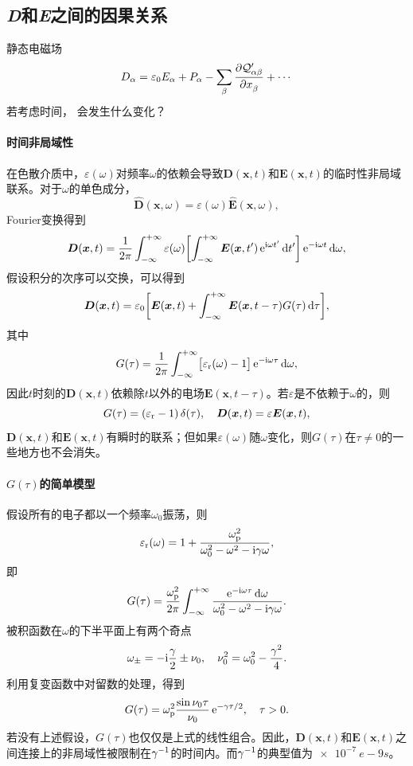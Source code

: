 \subsection{\textit{\textbf{D}}和\textit{\textbf{E}}之间的因果关系}
静态电磁场
\[
    D_\alpha=\varepsilon_0E_\alpha+P_\alpha-\sum_\beta\frac{\partial^{\;\!\!}\mathcal Q'_{\alpha\beta}}{\partial x_\beta^{\;\!\!}}+\cdots
\]
若考虑时间，
会发生什么变化？
\paragraph{时间非局域性}
在色散介质中，$\varepsilon(\omega)$对频率$\omega$的依赖会导致$\bm D(\bm x,t)$和$\bm E(\bm x,t)$的临时性非局域联系。对于$\omega$的单色成分，
\[
    \hat{\bm D}(\bm x,\omega)=\varepsilon(\omega)\hat{\bm E}(\bm x,\omega),
\]
Fourier变换得到
\[
    \bm D(\bm x,t)=\frac1{2\pi}\int_{-\infty}^{+\infty}\varepsilon(\omega)\biggl[\int_{-\infty}^{+\infty}\bm E(\bm x,t')\mathop{}\!\mathrm{e}^{\mathrm{i}\omega t'}\mathop{}\!\mathrm{d} t'\biggr]\mathop{}\!\mathrm{e}^{-\mathrm{i}\omega t}\mathop{}\!\mathrm{d}\omega,
\]
假设积分的次序可以交换，可以得到
\begin{equation}
    \label{eqn:D-E with omega}
    \bm D(\bm x,t)=\varepsilon_0\biggl[\bm E(\bm x,t)+\int_{-\infty}^{+\infty}\bm E(\bm x,t-\tau)G(\tau)\mathop{}\!\mathrm{d}\tau\biggr],
\end{equation}
其中 
\[
    G(\tau)=\frac1{2\pi}\int_{-\infty}^{+\infty}\bigl[\varepsilon_\text r(\omega)-1\bigr]\mathop{}\!\mathrm{e}^{-\mathrm{i}\omega\tau}\mathop{}\!\mathrm{d}\omega,
\]
因此$t$时刻的$\bm D(\bm x,t)$依赖除$t$以外的电场$\bm E(\bm x,t-\tau)$。若$\varepsilon$是不依赖于$\omega$的，则 
\[
    G(\tau)=(\varepsilon_\text r-1)\mathop{}\!\delta(\tau),\quad\bm D(\bm x,t)=\varepsilon\bm E(\bm x,t),
\]
$\bm D(\bm x,t)$和$\bm E(\bm x,t)$有瞬时的联系；但如果$\varepsilon(\omega)$随$\omega$变化，则$G(\tau)$在$\tau\neq 0$的一些地方也不会消失。
\paragraph{$G(\tau)$的简单模型}
假设所有的电子都以一个频率$\omega_0$振荡，则 
\[
    \varepsilon_\text r(\omega)=1+\frac{\omega_\text p^2}{\omega_0^2-\omega^2-\mathrm{i}\gamma\omega},
\]
即 
\[
    G(\tau)=\frac{\omega_\text p^2}{2\pi}\int_{-\infty}^{+\infty}\frac{\mathop{}\!\mathrm{e}^{-\mathrm{i}\omega\tau}\mathop{}\!\mathrm{d}\omega}{\omega_0^2-\omega^2-\mathrm{i}\gamma\omega}.
\]
被积函数在$\omega$的下半平面上有两个奇点
\[
    \omega_\pm=-\mathrm{i}\frac\gamma 2\pm\nu_0,\quad\nu_0^2=\omega_0^2-\frac{\gamma^2}4.
\]
利用复变函数中对留数的处理，得到
\[
    G(\tau)=\omega_\text p^2\frac{\sin\nu_0\tau}{\nu_0}\mathop{}\!\mathrm{e}^{-\gamma\tau/2},\quad\tau>0.
\]
若没有上述假设，$G(\tau)$也仅仅是上式的线性组合。因此，$\bm D(\bm x,t)$和$\bm E(\bm x,t)$之间连接上的非局域性被限制在$\gamma^{-1}$的时间内。而$\gamma^{-1}$的典型值为$\SI{e-7}{e-9}s$。

